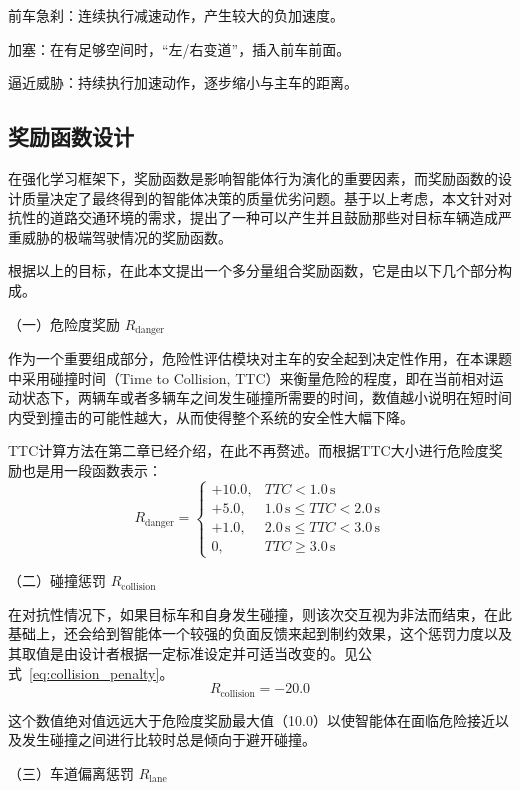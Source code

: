 前车急刹：连续执行减速动作，产生较大的负加速度。

加塞：在有足够空间时，“左/右变道”，插入前车前面。

逼近威胁：持续执行加速动作，逐步缩小与主车的距离。
\subsection{奖励函数设计}
在强化学习框架下，奖励函数是影响智能体行为演化的重要因素，而奖励函数的设计质量决定了最终得到的智能体决策的质量优劣问题。基于以上考虑，本文针对对抗性的道路交通环境的需求，提出了一种可以产生并且鼓励那些对目标车辆造成严重威胁的极端驾驶情况的奖励函数\cite{salau2025deep}。

根据以上的目标，在此本文提出一个多分量组合奖励函数，它是由以下几个部分构成。

（一）危险度奖励 $R_{\text{danger}}$

作为一个重要组成部分，危险性评估模块对主车的安全起到决定性作用，在本课题中采用碰撞时间（Time to Collision, TTC）来衡量危险的程度，即在当前相对运动状态下，两辆车或者多辆车之间发生碰撞所需要的时间，数值越小说明在短时间内受到撞击的可能性越大，从而使得整个系统的安全性大幅下降。

TTC计算方法在第二章已经介绍，在此不再赘述。而根据TTC大小进行危险度奖励也是用一段函数表示：
\begin{equation}
R_{\text{danger}} =
\begin{cases}
+10.0, & TTC < 1.0\,\text{s} \\
+5.0, & 1.0\,\text{s} \le TTC < 2.0\,\text{s} \\
+1.0, & 2.0\,\text{s} \le TTC < 3.0\,\text{s} \\
0, & TTC \ge 3.0\,\text{s}
\end{cases}
\label{eq:danger_reward}
\end{equation}

（二）碰撞惩罚 $R_{\text{collision}}$

在对抗性情况下，如果目标车和自身发生碰撞，则该次交互视为非法而结束，在此基础上，还会给到智能体一个较强的负面反馈来起到制约效果，这个惩罚力度以及其取值是由设计者根据一定标准设定并可适当改变的。见公式~\ref{eq:collision_penalty}。
\begin{equation}
R_{\text{collision}} =-20.0
\label{eq:collision_penalty}
\end{equation}

这个数值绝对值远远大于危险度奖励最大值（10.0）以使智能体在面临危险接近以及发生碰撞之间进行比较时总是倾向于避开碰撞。

（三）车道偏离惩罚 $R_{\text{lane}}$

